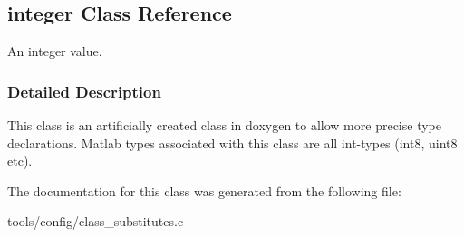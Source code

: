 \hypertarget{classinteger}{}\subsection{integer Class Reference}
\label{classinteger}


An integer value.  




\subsubsection{Detailed Description}
This class is an artificially created class in doxygen to allow more precise type declarations. Matlab types associated with this class are all int-\/types (int8, uint8 etc). 

The documentation for this class was generated from the following file\+:\begin{DoxyCompactItemize}
\item 
tools/config/class\+\_\+substitutes.\+c\end{DoxyCompactItemize}
